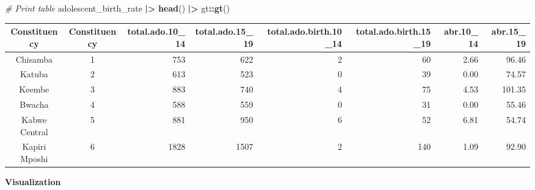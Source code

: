 \documentclass[
]{article}
\newenvironment{Shaded}{\begin{snugshade}}{\end{snugshade}}
\newcommand{\CommentTok}[1]{\textcolor[rgb]{0.56,0.35,0.01}{\textit{#1}}}
\newcommand{\FunctionTok}[1]{\textcolor[rgb]{0.13,0.29,0.53}{\textbf{#1}}}
\newcommand{\NormalTok}[1]{#1}
\newcommand{\SpecialCharTok}[1]{\textcolor[rgb]{0.81,0.36,0.00}{\textbf{#1}}}
\newenvironment{UNFPAShadedBox}{%
\begin{tcolorbox}[sharp corners, enhanced, colback=white, boxrule=0pt, borderline west={2pt}{0pt}{orange}]%
}{\end{tcolorbox}}
\newenvironment{Highlighting}{\begin{UNFPAShadedBox}}{\end{UNFPAShadedBox}}
\begin{document}
\begin{Shaded}
\begin{Highlighting}[]
\CommentTok{\# Print table}
\NormalTok{adolescent\_birth\_rate }\SpecialCharTok{|\textgreater{}}
  \FunctionTok{head}\NormalTok{() }\SpecialCharTok{|\textgreater{}}
\NormalTok{  gt}\SpecialCharTok{::}\FunctionTok{gt}\NormalTok{()}
\end{Highlighting}
\end{Shaded}

\begin{table}[!t]
\fontsize{12.0pt}{14.4pt}\selectfont
\begin{tabular*}{\linewidth}{@{\extracolsep{\fill}}ccrrrrrr}
\toprule
Constituency & Constituency & total.ado.10\_14 & total.ado.15\_19 & total.ado.birth.10\_14 & total.ado.birth.15\_19 & abr.10\_14 & abr.15\_19 \\ 
\midrule\addlinespace[2.5pt]
Chisamba & 1 & 753 & 622 & 2 & 60 & 2.66 & 96.46 \\ 
Katuba & 2 & 613 & 523 & 0 & 39 & 0.00 & 74.57 \\ 
Keembe & 3 & 883 & 740 & 4 & 75 & 4.53 & 101.35 \\ 
Bwacha & 4 & 588 & 559 & 0 & 31 & 0.00 & 55.46 \\ 
Kabwe Central & 5 & 881 & 950 & 6 & 52 & 6.81 & 54.74 \\ 
Kapiri Mposhi & 6 & 1828 & 1507 & 2 & 140 & 1.09 & 92.90 \\ 
\bottomrule
\end{tabular*}
\end{table}

\textbf{Visualization}
\end{document}
